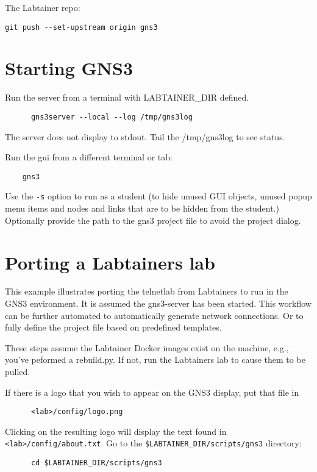 \documentclass[12pt]{article}
\begin{document}
\noindent The Labtainer repo:
\begin{verbatim}
git push --set-upstream origin gns3
\end{verbatim}

\section{Starting GNS3}
Run the server from a terminal with LABTAINER\_DIR defined.

\begin{verbatim}
      gns3server --local --log /tmp/gns3log
\end{verbatim}
\noindent The server does not display to stdout.  Tail the /tmp/gns3log to see status.

\noindent Run the gui from a different terminal or tab:
\begin{verbatim}
    gns3
\end{verbatim}
\noindent Use the {\tt -s} option to run as a student (to hide unused GUI objects, unused popup menu items
and nodes and links that are to be hidden from the student.)  Optionally provide the path to the gns3 project
file to avoid the project dialog.

\section{Porting a Labtainers lab}
This example illustrates porting the telnetlab from Labtainers to run in the GNS3 environment.
It is assumed the gns3-server has been started.
This workflow can be further automated to automatically generate network connections.  Or to fully define the project
file based on predefined templates.

These steps assume the Labtainer Docker images exist on the machine, e.g., you've peformed a rebuild.py.  If not, run the Labtainers lab
to cause them to be pulled. 

\bigskip
If there is a logo that you wish to appear on the GNS3 display, put that file in 
\begin{verbatim}
      <lab>/config/logo.png
\end{verbatim}

\noindent Clicking on the resulting logo will display the text found in {\tt <lab>/config/about.txt}.
\bigskip
Go to the {\tt \$LABTAINER\_DIR/scripts/gns3} directory:
\begin{verbatim}
      cd $LABTAINER_DIR/scripts/gns3
\end{verbatim}
\end{document}

